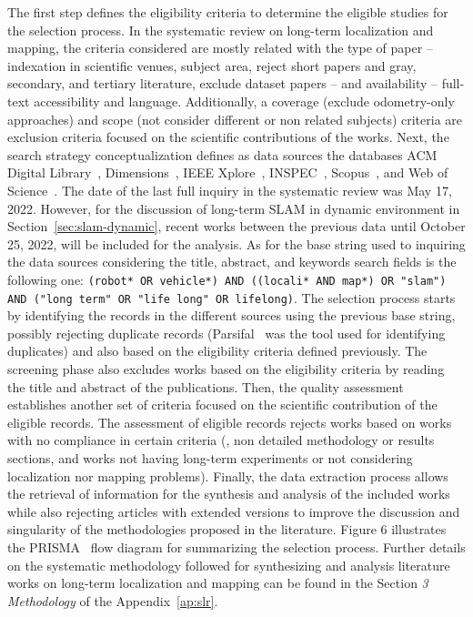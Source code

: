 The first step defines the eligibility criteria to determine the eligible studies for the selection process. In the systematic review on long-term localization and mapping, the criteria considered are mostly related with the type of paper -- indexation in scientific venues, subject area, reject short papers and gray, secondary, and tertiary literature, exclude dataset papers -- and availability -- full-text accessibility and language. Additionally, a coverage (exclude odometry-only approaches) and scope (not consider different or non related subjects) criteria are exclusion criteria focused on the scientific contributions of the works.
Next, the search strategy conceptualization defines as data sources the databases ACM Digital Library~\cite{literature:db:acm}, Dimensions~\cite{literature:db:dim}, IEEE Xplore~\cite{literature:db:ieee}, INSPEC~\cite{literature:db:insp}, Scopus~\cite{literature:db:scopus}, and Web of Science~\cite{literature:db:wos}. The date of the last full inquiry in the systematic review was May 17, 2022. However, for the discussion of long-term \gls{SLAM} in dynamic environment in Section~\ref{sec:slam-dynamic}, recent works between the previous data until October 25, 2022, will be included for the analysis. As for the base string used to inquiring the data sources considering the title, abstract, and keywords search fields is the following one: \texttt{(robot* OR vehicle*) AND ((locali* AND map*) OR "slam") AND ("long term" OR "life long" OR lifelong)}.
The selection process starts by identifying the records in the different sources using the previous base string, possibly rejecting duplicate records (Parsifal~\cite{methodology:parsifal} was the tool used for identifying duplicates) and also based on the eligibility criteria defined previously. The screening phase also excludes works based on the eligibility criteria by reading the title and abstract of the publications. Then, the quality assessment establishes another set of criteria focused on the scientific contribution of the eligible records. The assessment of eligible records rejects works based on works with no compliance in certain criteria (\eg, non detailed methodology or results sections, and works not having long-term experiments or not considering localization nor mapping problems).
Finally, the data extraction process allows the retrieval of information for the synthesis and analysis of the included works while also rejecting articles with extended versions to improve the discussion and singularity of the methodologies proposed in the literature.
Figure 6 illustrates the \gls{PRISMA}~\cite{methodology:prisma} flow diagram for summarizing the selection process. Further details on the systematic methodology followed for synthesizing and analysis literature works on long-term localization and mapping can be found in the Section \textit{3 Methodology} of the Appendix~\ref{ap:slr}.

